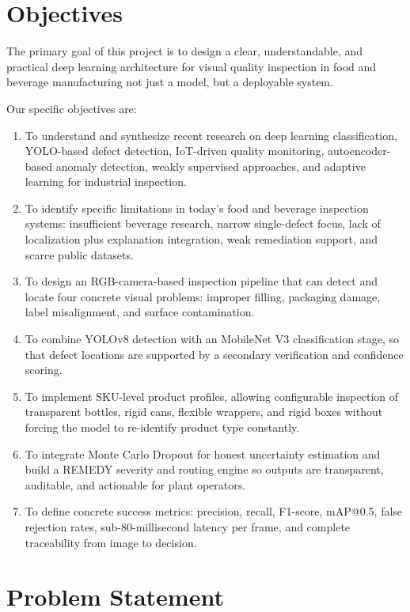 \documentclass[12pt,a4paper]{report}
\begin{document}
\section{Objectives}
\label{sec:objectives}

The primary goal of this project is to design a clear, understandable, and practical deep learning architecture for visual quality inspection in food and beverage manufacturing not just a model, but a deployable system.

Our specific objectives are:
\begin{enumerate}
  \item To understand and synthesize recent research on deep learning classification, YOLO-based defect detection, IoT-driven quality monitoring, autoencoder-based anomaly detection, weakly supervised approaches, and adaptive learning for industrial inspection.
  \item To identify specific limitations in today's food and beverage inspection systems: insufficient beverage research, narrow single-defect focus, lack of localization plus explanation integration, weak remediation support, and scarce public datasets.
  \item To design an RGB-camera-based inspection pipeline that can detect and locate four concrete visual problems: improper filling, packaging damage, label misalignment, and surface contamination.
  \item To combine YOLOv8 detection with an MobileNet V3 classification stage, so that defect locations are supported by a secondary verification and confidence scoring.
  \item To implement SKU-level product profiles, allowing configurable inspection of transparent bottles, rigid cans, flexible wrappers, and rigid boxes without forcing the model to re-identify product type constantly.
  \item To integrate Monte Carlo Dropout for honest uncertainty estimation and build a REMEDY severity and routing engine so outputs are transparent, auditable, and actionable for plant operators.
  \item To define concrete success metrics: precision, recall, F1-score, mAP@0.5, false rejection rates, sub-80-millisecond latency per frame, and complete traceability from image to decision.
\end{enumerate}

\section{Problem Statement}
\label{sec:problem-statement}
\end{document}
